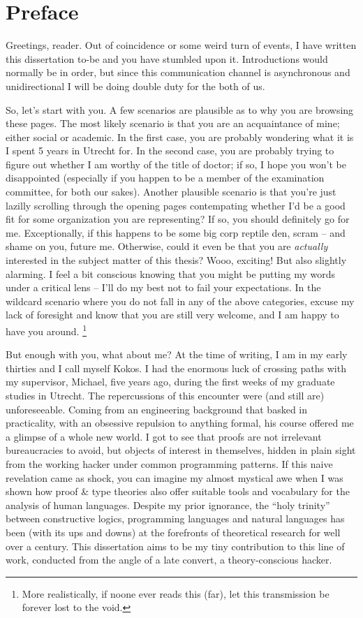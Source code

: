 \chapter*{Preface}

Greetings, reader. Out of coincidence or some weird turn of events, I have written this dissertation to-be and you have stumbled upon it.
Introductions would normally be in order, but since this communication channel is asynchronous and unidirectional I will be doing double duty for the both of us.

So, let's start with you. 
A few scenarios are plausible as to why you are browsing these pages. 
The most likely scenario is that you are an acquaintance of mine; either social or academic.
In the first case, you are probably wondering what it is I spent 5 years in Utrecht for.
In the second case, you are probably trying to figure out whether I am worthy of the title of doctor; if so, I hope you won’t be disappointed (especially if you happen to be a member of the examination committee, for both our sakes).
Another plausible scenario is that you're just lazilly scrolling through the opening pages contempating whether I'd be a good fit for some organization you are representing?
If so, you should definitely go for me.
Exceptionally, if this happens to be some big corp reptile den, scram -- and shame on you, future me.
Otherwise, could it even be that you are \textit{actually} interested in the subject matter of this thesis? 
Wooo, exciting!
But also slightly alarming.
I feel a bit conscious knowing that you might be putting my words under a critical lens – I’ll do my best not to fail your expectations. 
In the wildcard scenario where you do not fall in any of the above categories, excuse my lack of foresight and know that you are still very welcome, and I am happy to have you around.%
\footnote{More realistically, if noone ever reads this (far), let this transmission be forever lost to the void.}

But enough with you, what about me? 
At the time of writing, I am in my early thirties and I call myself Kokos. 
I had the enormous luck of crossing paths with my supervisor, Michael, five years ago, during the first weeks of my graduate studies in Utrecht. 
The repercussions of this encounter were (and still are) unforeseeable. 
Coming from an engineering background that basked in practicality, with an obsessive repulsion to anything formal, his course offered me a glimpse of a whole new world. 
I got to see that proofs are not irrelevant bureaucracies to avoid, but objects of interest in themselves, hidden in plain sight from the working hacker under common programming patterns. 
If this naive revelation came as shock, you can imagine my almost mystical awe when I was shown how proof \& type theories also offer suitable tools and vocabulary for the analysis of human languages. 
Despite my prior ignorance, the “holy trinity” between constructive logics, programming languages and natural languages has been (with its ups and downs) at the forefronts of theoretical research for well over a century. 
This dissertation aims to be my tiny contribution to this line of work, conducted from the angle of a late convert, a theory-conscious hacker. 

